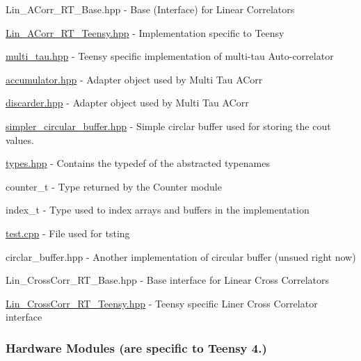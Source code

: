 \begin{DoxyItemize}
\item {\ttfamily Lin\+\_\+\+A\+Corr\+\_\+\+R\+T\+\_\+\+Base.\+hpp} -\/ Base (Interface) for Linear Correlators
\item {\ttfamily \hyperlink{Lin__ACorr__RT__Teensy_8hpp}{Lin\+\_\+\+A\+Corr\+\_\+\+R\+T\+\_\+\+Teensy.\+hpp}} -\/ Implementation specific to Teensy
\item {\ttfamily \hyperlink{multi__tau_8hpp}{multi\+\_\+tau.\+hpp}} -\/ Teensy specific implementation of multi-\/tau Auto-\/correlator
\item {\ttfamily \hyperlink{accumulator_8hpp}{accumulator.\+hpp}} -\/ Adapter object used by Multi Tau A\+Corr
\item {\ttfamily \hyperlink{discarder_8hpp}{discarder.\+hpp}} -\/ Adapter object used by Multi Tau A\+Corr
\item {\ttfamily \hyperlink{simpler__circular__buffer_8hpp}{simpler\+\_\+circular\+\_\+buffer.\+hpp}} -\/ Simple circlar buffer used for storing the cout values.
\item {\ttfamily \hyperlink{types_8hpp}{types.\+hpp}} -\/ Contains the {\ttfamily typedef} of the abstracted typenames
\begin{DoxyItemize}
\item {\ttfamily counter\+\_\+t} -\/ Type returned by the Counter module
\item {\ttfamily index\+\_\+t} -\/ Type used to index arrays and buffers in the implementation
\end{DoxyItemize}
\item {\ttfamily \hyperlink{test_8cpp}{test.\+cpp}} -\/ File used for tsting
\item {\ttfamily circlar\+\_\+buffer.\+hpp} -\/ Another implementation of circular buffer (unsued right now)
\item {\ttfamily Lin\+\_\+\+Cross\+Corr\+\_\+\+R\+T\+\_\+\+Base.\+hpp} -\/ Base interface for Linear Cross Correlators
\item {\ttfamily \hyperlink{Lin__CrossCorr__RT__Teensy_8hpp}{Lin\+\_\+\+Cross\+Corr\+\_\+\+R\+T\+\_\+\+Teensy.\+hpp}} -\/ Teensy specific Liner Cross Correlator interface
\end{DoxyItemize}

\subsubsection*{Hardware Modules (are specific to Teensy 4.)}

